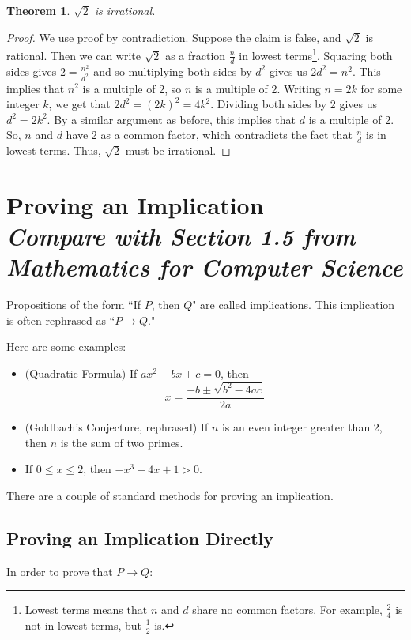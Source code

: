 \documentclass[11pt,oneside]{book}
\newtheorem{thm}{Theorem}[section]
\theoremstyle{definition}
\begin{document}
\begin{thm}
    $\sqrt{2}$ is irrational.
\end{thm}
\begin{proof}
    We use proof by contradiction.
    Suppose the claim is false, and $\sqrt{2}$ is rational.
    Then we can write $\sqrt{2}$ as a fraction $\frac{n}{d}$ in lowest terms\footnote{
        Lowest terms means that $n$ and $d$ share no common factors.
        For example, $\frac{2}{4}$ is not in lowest terms, but $\frac{1}{2}$ is.
    }.
    Squaring both sides gives $2 = \frac{n^{2}}{d^{2}}$ and so multiplying both sides by $d^{2}$ gives us $2d^{2} = n^{2}$.
    This implies that $n^{2}$ is a multiple of 2, so $n$ is a multiple of 2.
    Writing $n = 2k$ for some integer $k$, we get that $2d^{2} = (2k)^{2} = 4k^{2}$.
    Dividing both sides by 2 gives us $d^{2} = 2k^{2}$.
    By a similar argument as before, this implies that $d$ is a multiple of 2.
    So, $n$ and $d$ have 2 as a common factor, which contradicts
    the fact that $\frac{n}{d}$ is in lowest terms.
    Thus, $\sqrt{2}$ must be irrational.
\end{proof}


\section[Proving an Implication]{Proving an Implication\\[0.5ex]
\normalsize\normalfont\textit{
    Compare with Section 1.5 from \emph{Mathematics for Computer Science}
}} \label{sec:ImplicationProof}
Propositions of the form ``If $P$, then $Q$" are called implications.
This implication is often rephrased as ``$P \rightarrow Q$."

Here are some examples:

\begin{itemize}
    \item (Quadratic Formula) If $ax^{2} + bx + c = 0$, then
    \[ x = \frac{-b \pm \sqrt{b^{2} - 4ac}}{2a} \]

    \item (Goldbach's Conjecture, rephrased) If $n$ is an even integer greater than 2, then $n$ is the sum of two primes.

    \item If $0 \leq x \leq 2$, then $-x^{3} + 4x + 1 > 0$.
\end{itemize}

There are a couple of standard methods for proving an implication.


\subsection{Proving an Implication Directly}
In order to prove that $P \rightarrow Q$:
\end{document}
